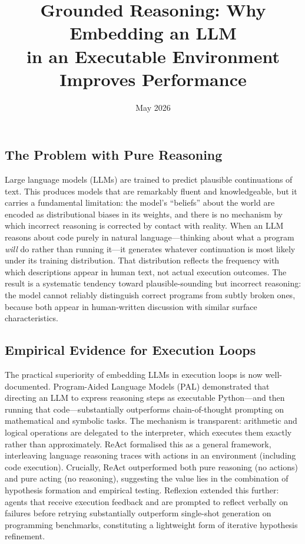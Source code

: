 \documentclass[10.5pt]{article}
\title{\textbf{Grounded Reasoning: Why Embedding an LLM\\[4pt]
in an Executable Environment Improves Performance}}
\author{}
\date{May 2026}
\begin{document}
\maketitle
\vspace{-1em}

\subsection*{The Problem with Pure Reasoning}

Large language models (LLMs) are trained to predict plausible continuations of
text. This produces models that are remarkably fluent and knowledgeable, but it
carries a fundamental limitation: the model's ``beliefs'' about the world are
encoded as distributional biases in its weights, and there is no mechanism by
which incorrect reasoning is corrected by contact with reality. When an LLM
reasons about code purely in natural language---thinking about what a program
\emph{will} do rather than running it---it generates whatever continuation is
most likely under its training distribution. That distribution reflects the
frequency with which descriptions appear in human text, not actual execution
outcomes. The result is a systematic tendency toward plausible-sounding but
incorrect reasoning: the model cannot reliably distinguish correct programs from
subtly broken ones, because both appear in human-written discussion with similar
surface characteristics.

\subsection*{Empirical Evidence for Execution Loops}

The practical superiority of embedding LLMs in execution loops is now
well-documented. Program-Aided Language Models (PAL) \cite{gao2023pal}
demonstrated that directing an LLM to express reasoning steps as executable
Python---and then running that code---substantially outperforms chain-of-thought
prompting on mathematical and symbolic tasks. The mechanism is transparent:
arithmetic and logical operations are delegated to the interpreter, which
executes them exactly rather than approximately. ReAct \cite{yao2023react}
formalised this as a general framework, interleaving language reasoning traces
with actions in an environment (including code execution). Crucially, ReAct
outperformed both pure reasoning (no actions) and pure acting (no reasoning),
suggesting the value lies in the combination of hypothesis formation and
empirical testing. Reflexion \cite{shinn2023reflexion} extended this further:
agents that receive execution feedback and are prompted to reflect verbally on
failures before retrying substantially outperform single-shot generation on
programming benchmarks, constituting a lightweight form of iterative hypothesis
refinement.
\end{document}

